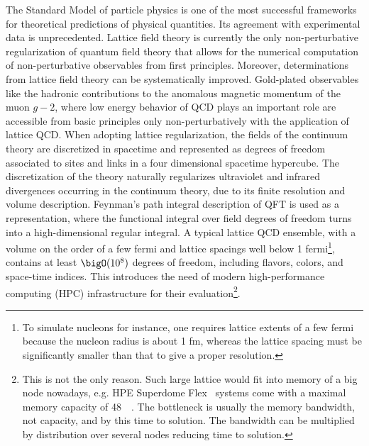The Standard Model of particle physics is one of the most successful frameworks for theoretical predictions of physical quantities.
Its agreement with experimental data is unprecedented.
Lattice field theory is currently the only non-perturbative regularization of quantum field theory that allows for the numerical computation of non-perturbative observables from first principles.
Moreover, determinations from lattice field theory can be systematically improved.
Gold-plated observables like the hadronic contributions to the anomalous magnetic momentum of the muon $g-2$, where low energy behavior of QCD plays an important role are accessible from basic principles only non-perturbatively with the application of lattice QCD.
When adopting lattice regularization, the fields of the continuum theory are discretized in spacetime and represented as degrees of freedom associated to sites and links in a four dimensional spacetime hypercube.
The discretization of the theory naturally regularizes ultraviolet and infrared divergences occurring in the continuum theory, due to its finite resolution and volume description.
Feynman's path integral description of QFT is used as a representation, where the functional integral over field degrees of freedom turns into a high-dimensional regular integral.
A typical lattice QCD ensemble, with a volume on the order of a few fermi and lattice spacings well below \num{1} fermi\footnote{To simulate nucleons for instance, one requires lattice extents of a few fermi because the nucleon radius is about \num{1} fm, whereas the lattice spacing must be significantly smaller than that to give a proper resolution.}, contains at least $\bigO(10^8)$ degrees of freedom, including flavors, colors, and space-time indices.
This introduces the need of modern high-performance computing (HPC) infrastructure for their evaluation\footnote{This is not the only reason. Such large lattice would fit into memory of a big node nowadays, e.g. HPE Superdome Flex~\cite{online:superdome} systems come with a maximal memory capacity of \SI{48}{\tera \byte}. The bottleneck is usually the memory bandwidth, not capacity, and by this time to solution. The bandwidth can be multiplied by distribution over several nodes reducing time to solution.}.
